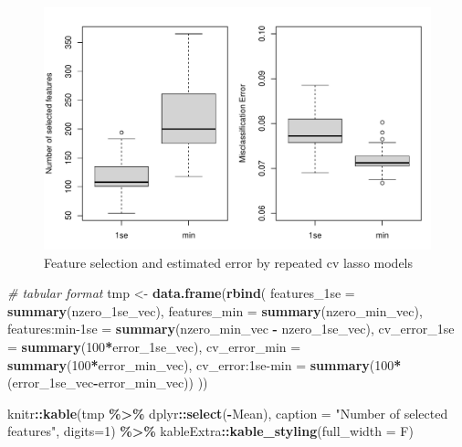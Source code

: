\documentclass[
]{book}
\newenvironment{Shaded}{\begin{snugshade}}{\end{snugshade}}
\newcommand{\CommentTok}[1]{\textcolor[rgb]{0.56,0.35,0.01}{\textit{#1}}}
\newcommand{\DataTypeTok}[1]{\textcolor[rgb]{0.13,0.29,0.53}{#1}}
\newcommand{\DecValTok}[1]{\textcolor[rgb]{0.00,0.00,0.81}{#1}}
\newcommand{\KeywordTok}[1]{\textcolor[rgb]{0.13,0.29,0.53}{\textbf{#1}}}
\newcommand{\NormalTok}[1]{#1}
\newcommand{\OperatorTok}[1]{\textcolor[rgb]{0.81,0.36,0.00}{\textbf{#1}}}
\newcommand{\StringTok}[1]{\textcolor[rgb]{0.31,0.60,0.02}{#1}}
\begin{document}
\begin{figure}
\centering
\includegraphics{Static/figures/model-size-lassoAll-1.pdf}
\caption{\label{fig:model-size-lassoAll}Feature selection and estimated error by repeated cv lasso models}
\end{figure}

\begin{Shaded}
\begin{Highlighting}[]
\CommentTok{\# tabular format}
\NormalTok{tmp <{-}}\StringTok{ }\KeywordTok{data.frame}\NormalTok{(}\KeywordTok{rbind}\NormalTok{(}
 \StringTok{\textasciigrave{}}\DataTypeTok{features\_1se}\StringTok{\textasciigrave{}}\NormalTok{ =}\StringTok{ }\KeywordTok{summary}\NormalTok{(nzero\_1se\_vec),}
 \DataTypeTok{features\_min =} \KeywordTok{summary}\NormalTok{(nzero\_min\_vec),}
 \StringTok{\textasciigrave{}}\DataTypeTok{features:min{-}1se}\StringTok{\textasciigrave{}}\NormalTok{ =}\StringTok{ }\KeywordTok{summary}\NormalTok{(nzero\_min\_vec }\OperatorTok{{-}}\StringTok{ }\NormalTok{nzero\_1se\_vec),}
 \StringTok{\textasciigrave{}}\DataTypeTok{cv\_error\_1se}\StringTok{\textasciigrave{}}\NormalTok{ =}\StringTok{ }\KeywordTok{summary}\NormalTok{(}\DecValTok{100}\OperatorTok{*}\NormalTok{error\_1se\_vec),}
 \DataTypeTok{cv\_error\_min =} \KeywordTok{summary}\NormalTok{(}\DecValTok{100}\OperatorTok{*}\NormalTok{error\_min\_vec),}
 \StringTok{\textasciigrave{}}\DataTypeTok{cv\_error:1se{-}min}\StringTok{\textasciigrave{}}\NormalTok{ =}\StringTok{ }\KeywordTok{summary}\NormalTok{(}\DecValTok{100}\OperatorTok{*}\NormalTok{(error\_1se\_vec}\OperatorTok{{-}}\NormalTok{error\_min\_vec))}
\NormalTok{))}

\NormalTok{knitr}\OperatorTok{::}\KeywordTok{kable}\NormalTok{(tmp }\OperatorTok{\%>\%}\StringTok{ }\NormalTok{dplyr}\OperatorTok{::}\KeywordTok{select}\NormalTok{(}\OperatorTok{{-}}\NormalTok{Mean),}
  \DataTypeTok{caption =} \StringTok{"Number of selected features"}\NormalTok{,}
  \DataTypeTok{digits=}\DecValTok{1}\NormalTok{) }\OperatorTok{\%>\%}
\StringTok{   }\NormalTok{kableExtra}\OperatorTok{::}\KeywordTok{kable\_styling}\NormalTok{(}\DataTypeTok{full\_width =}\NormalTok{ F)}
\end{Highlighting}
\end{Shaded}
\end{document}
